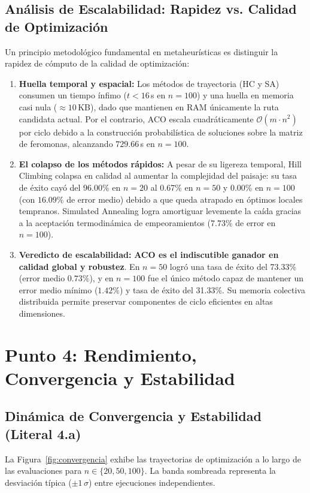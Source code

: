 \documentclass[11pt, a4paper]{article}
\begin{document}
\subsection{Análisis de Escalabilidad: Rapidez vs. Calidad de Optimización}
Un principio metodológico fundamental en metaheurísticas es distinguir la rapidez de cómputo de la calidad de optimización:
\begin{enumerate}
    \item \textbf{Huella temporal y espacial:} Los métodos de trayectoria (HC y SA) consumen un tiempo ínfimo ($t < 16$\,s en $n=100$) y una huella en memoria casi nula ($\approx 10$\,KB), dado que mantienen en RAM únicamente la ruta candidata actual. Por el contrario, ACO escala cuadráticamente $\mathcal{O}(m \cdot n^2)$ por ciclo debido a la construcción probabilística de soluciones sobre la matriz de feromonas, alcanzando $729.66$\,s en $n=100$.
    \item \textbf{El colapso de los métodos rápidos:} A pesar de su ligereza temporal, Hill Climbing colapsa en calidad al aumentar la complejidad del paisaje: su tasa de éxito cayó del 96.00\% en $n=20$ al 0.67\% en $n=50$ y 0.00\% en $n=100$ (con $16.09\%$ de error medio) debido a que queda atrapado en óptimos locales tempranos. Simulated Annealing logra amortiguar levemente la caída gracias a la aceptación termodinámica de empeoramientos ($7.73\%$ de error en $n=100$).
    \item \textbf{Veredicto de escalabilidad:} \textbf{ACO es el indiscutible ganador en calidad global y robustez}. En $n=50$ logró una tasa de éxito del 73.33\% (error medio $0.73\%$), y en $n=100$ fue el único método capaz de mantener un error medio mínimo ($1.42\%$) y tasa de éxito del 31.33\%. Su memoria colectiva distribuida permite preservar componentes de ciclo eficientes en altas dimensiones.
\end{enumerate}

\section{Punto 4: Rendimiento, Convergencia y Estabilidad}

\subsection{Dinámica de Convergencia y Estabilidad (Literal 4.a)}
La Figura~\ref{fig:convergencia} exhibe las trayectorias de optimización a lo largo de las evaluaciones para $n \in \{20, 50, 100\}$. La banda sombreada representa la desviación típica ($\pm 1\,\sigma$) entre ejecuciones independientes. 
\end{document}
